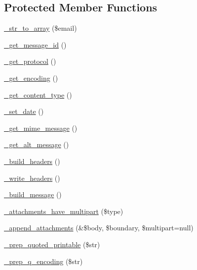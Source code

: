 \subsection*{Protected Member Functions}
\begin{DoxyCompactItemize}
\item 
\mbox{\hyperlink{class_c_i___email_a64cd83e470ede0781d028d7198474d1c}{\+\_\+str\+\_\+to\+\_\+array}} (\$email)
\item 
\mbox{\hyperlink{class_c_i___email_a253c34263736465755f85ec4192aa6b4}{\+\_\+get\+\_\+message\+\_\+id}} ()
\item 
\mbox{\hyperlink{class_c_i___email_ad0000c693b4b2768f56fcc1049f8b3c7}{\+\_\+get\+\_\+protocol}} ()
\item 
\mbox{\hyperlink{class_c_i___email_ab7a90b9198c0384a2a330728f2c78ebd}{\+\_\+get\+\_\+encoding}} ()
\item 
\mbox{\hyperlink{class_c_i___email_a0df0801e489187b9f8108ec776f98f2e}{\+\_\+get\+\_\+content\+\_\+type}} ()
\item 
\mbox{\hyperlink{class_c_i___email_a0c25effa0066e09273d092572709f6eb}{\+\_\+set\+\_\+date}} ()
\item 
\mbox{\hyperlink{class_c_i___email_a2211ba669bd8d076041d4e72bc8a9c59}{\+\_\+get\+\_\+mime\+\_\+message}} ()
\item 
\mbox{\hyperlink{class_c_i___email_a1a87461e94ab7466b7b6f22682c4a055}{\+\_\+get\+\_\+alt\+\_\+message}} ()
\item 
\mbox{\hyperlink{class_c_i___email_a5dbec091c7efce89395a40e460b75d49}{\+\_\+build\+\_\+headers}} ()
\item 
\mbox{\hyperlink{class_c_i___email_a6bde7269215bc1093811ae098bb034bf}{\+\_\+write\+\_\+headers}} ()
\item 
\mbox{\hyperlink{class_c_i___email_a9ddc60e529eb909ff0879781a6f296ff}{\+\_\+build\+\_\+message}} ()
\item 
\mbox{\hyperlink{class_c_i___email_ae652360ac4267d201218921f46b77df7}{\+\_\+attachments\+\_\+have\+\_\+multipart}} (\$type)
\item 
\mbox{\hyperlink{class_c_i___email_a24b79594abe7528b9207c3dad7494f70}{\+\_\+append\+\_\+attachments}} (\&\$body, \$boundary, \$multipart=null)
\item 
\mbox{\hyperlink{class_c_i___email_af2beda05a0ab5d0ec65b03da633b1d33}{\+\_\+prep\+\_\+quoted\+\_\+printable}} (\$str)
\item 
\mbox{\hyperlink{class_c_i___email_a56a4d842c3dfe77bcb41082a82c5df24}{\+\_\+prep\+\_\+q\+\_\+encoding}} (\$str)

\end{DoxyCompactItemize}
